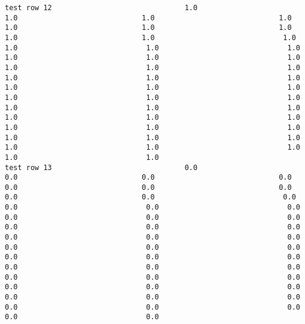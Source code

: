 \documentclass[11pt]{article}
\begin{document}
\begin{verbatim}
test row 12                               1.0                             1.0                             1.0                             1.0                             1.0                             1.0                             1.0                             1.0                             1.0                              1.0                              1.0                              1.0                              1.0                              1.0                              1.0                              1.0                              1.0                              1.0                              1.0                              1.0                              1.0                              1.0                              1.0                              1.0                              1.0                              1.0                              1.0                              1.0                              1.0                              1.0                              1.0                              1.0                              1.0                              1.0                              1.0                              1.0                              1.0                              1.0                              1.0                              1.0                              1.0                              1.0                              1.0                              1.0                              1.0
test row 13                               0.0                             0.0                             0.0                             0.0                             0.0                             0.0                             0.0                             0.0                             0.0                              0.0                              0.0                              0.0                              0.0                              0.0                              0.0                              0.0                              0.0                              0.0                              0.0                              0.0                              0.0                              0.0                              0.0                              0.0                              0.0                              0.0                              0.0                              0.0                              0.0                              0.0                              0.0                              0.0                              0.0                              0.0                              0.0                              0.0                              0.0                              0.0                              0.0                              0.0                              0.0                              0.0                              0.0                              0.0                              0.0

\end{verbatim}
\end{document}
